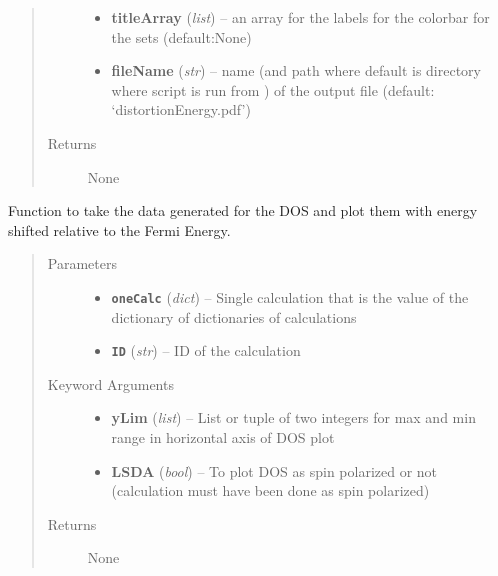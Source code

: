 \documentclass[letterpaper,10pt,english]{sphinxmanual}
\begin{document}
\begin{fulllineitems}
\begin{quote}
\begin{description}
\begin{itemize}
\item {} 
\textbf{titleArray} (\emph{list}) --
an array for the labels for the colorbar for the sets (default:None)

\item {} 
\textbf{fileName} (\emph{str}) --
name (and path where default is directory where script is run from )
of the output file (default: `distortionEnergy.pdf')

\end{itemize}

\item[{Returns}] \leavevmode
None

\end{description}\end{quote}

\end{fulllineitems}


\begin{fulllineitems}
\label{plot:plot.__dosPlot}
Function to take the data generated for the DOS and plot them with energy shifted relative to the Fermi Energy.
\begin{quote}\begin{description}
\item[{Parameters}] \leavevmode\begin{itemize}
\item {} 
\textbf{\texttt{oneCalc}} (\emph{dict}) -- Single calculation that is the value of the dictionary of dictionaries of calculations

\item {} 
\textbf{\texttt{ID}} (\emph{str}) -- ID of the calculation

\end{itemize}

\item[{Keyword Arguments}] \leavevmode\begin{itemize}
\item {} 
\textbf{yLim} (\emph{list}) --
List or tuple of two integers for max and min range in horizontal axis of DOS plot

\item {} 
\textbf{LSDA} (\emph{bool}) --
To plot DOS as spin polarized or not (calculation must have been done as spin polarized)

\end{itemize}

\item[{Returns}] \leavevmode
None

\end{description}\end{quote}

\end{fulllineitems}
\end{document}
